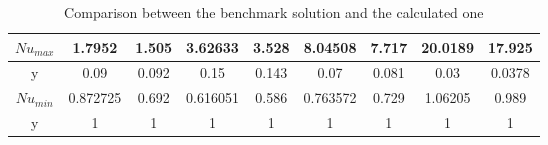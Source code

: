 \begin{table}[h]
\begin{tabular}{c|c|c|c|c|c|c|c|c|}
		\multicolumn{1}{|c|}{$Nu_{max}$} & 1.7952                    & 1.505                & 3.62633                   & 3.528                & 8.04508                   & 7.717                & 20.0189                   & 17.925               \\ \hline
		\multicolumn{1}{|c|}{y}     & 0.09                      & 0.092                & 0.15                      & 0.143                & 0.07                      & 0.081                & 0.03                      & 0.0378               \\ \hline
		\multicolumn{1}{|c|}{$Nu_{min}$} & 0.872725                  & 0.692                & 0.616051                  & 0.586                & 0.763572                  & 0.729                & 1.06205                   & 0.989                \\ \hline
		\multicolumn{1}{|c|}{y}     & 1                         & 1                    & 1                         & 1                    & 1                         & 1                    & 1                         & 1                    \\ \hline
	\end{tabular}
\caption[Comparison between the benchmark solution and the calculated one]{Comparison between the benchmark solution and the calculated one \cite{DeVahlDavis1983}}
\end{table}
